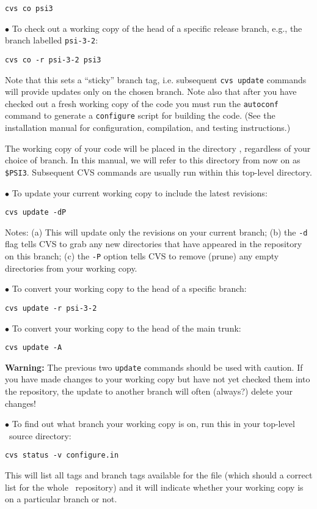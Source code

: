 {\tt cvs co psi3} 

\noindent
$\bullet$ To check out a working copy of the head of a specific release branch,
e.g., the branch labelled {\tt psi-3-2}:

{\tt cvs co -r psi-3-2 psi3}

\noindent Note that this sets a ``sticky'' branch tag, i.e. subsequent
{\tt cvs update} commands will provide updates only on the chosen branch.
Note also that after you have checked out a fresh working copy of the code
you must run the {\tt autoconf} command to generate a {\tt configure} script
for building the code.  (See the installation manual for configuration,
compilation, and testing instructions.)

\noindent The working copy of your code will be placed in the directory
, regardless of your choice of branch.  In this manual, we will
refer to this directory from now on as {\tt \$PSI3}.  Subsequent CVS
commands are usually run within this top-level directory.

\noindent
$\bullet$ To update your current working copy to include the latest revisions:

{\tt cvs update -dP}

\noindent
Notes: (a) This will update only the revisions on your current branch;
(b) the {\tt -d} flag tells CVS to grab any new directories that have
appeared in the repository on this branch; (c) the {\tt -P} option tells
CVS to remove (prune) any empty directories from your working copy.

\noindent
$\bullet$ To convert your working copy to the head of a specific branch:

{\tt cvs update -r psi-3-2}

\noindent
$\bullet$ To convert your working copy to the head of the main trunk:

{\tt cvs update -A}

\noindent
{\bf Warning:} The previous two {\tt update} commands should be used {\sc
with caution}.  If you have made changes to your working copy but have
not yet checked them into the repository, the update to another branch
will often (always?) delete your changes!

\noindent
$\bullet$ To find out what branch your working copy is on, run this in your
top-level \PSIthree\ source directory:

{\tt cvs status -v configure.in}

\noindent
This will list all tags and branch tags available for the file (which
should a correct list for the whole \PSIthree\ repository) and it will
indicate whether your working copy is on a particular branch or not.


